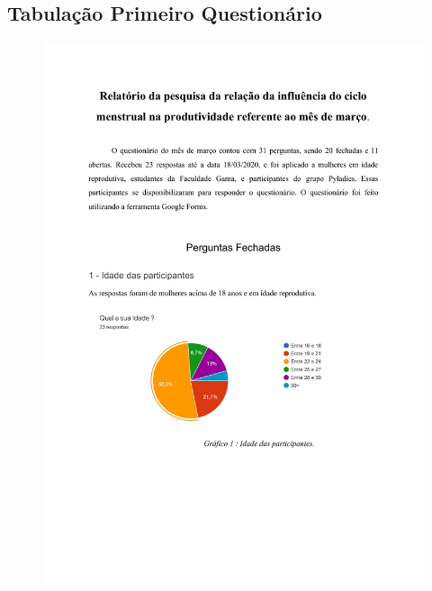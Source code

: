 \begin{apendicesenv}

    \partapendices
    \chapter{Tabulação Primeiro Questionário}
     
        \begin{figure}[ht]
            \centering
            \includegraphics[keepaspectratio=true,scale=0.6]{figuras/Tab.pdf}
        \end{figure}
        

\end{apendicesenv}
